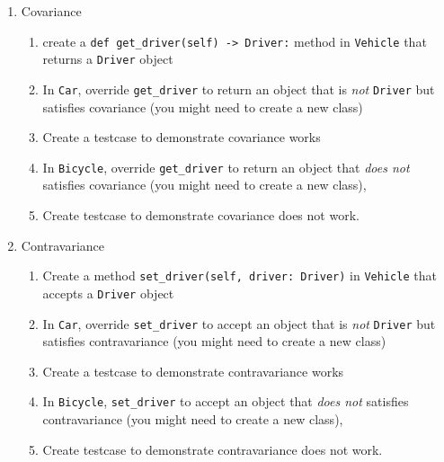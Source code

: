 \documentclass[oneside,11pt,dvipsnames]{book}
\newcommand{\code}[1]{\texttt{#1}}
\begin{document}
\begin{enumerate}
\begin{enumerate}
    \end{enumerate}
    \item Covariance
    \begin{enumerate}
        \item create a \code{def get\_driver(self) -> Driver:} method in \code{Vehicle} that returns a \code{Driver} object
        \item In \code{Car}, override \code{get\_driver} to return an object that is \emph{not} \code{Driver} but satisfies covariance (you might need to create a new class)
        \item Create a testcase to demonstrate covariance works 
        \item In \code{Bicycle}, override \code{get\_driver} to return an object that \emph{does not} satisfies covariance (you might need to create a new class), \item Create testcase to demonstrate covariance does not work.
    \end{enumerate}    
    \item Contravariance
    \begin{enumerate}
        \item Create a method \code{set\_driver(self, driver: Driver)} in \code{Vehicle} that accepts a \code{Driver} object
        \item In \code{Car}, override \code{set\_driver} to accept an object that is \emph{not} \code{Driver} but satisfies contravariance (you might need to create a new class)
        \item Create a testcase to demonstrate contravariance works
        \item In \code{Bicycle}, \code{set\_driver} to accept an object that \emph{does not} satisfies contravariance (you might need to create a new class),
        \item Create testcase to demonstrate contravariance does not work.
    \end{enumerate}
\end{enumerate}



\end{document}
